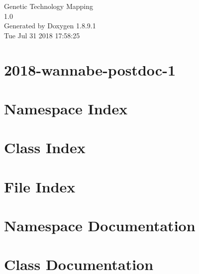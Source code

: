 \documentclass[twoside]{book}
\newcommand{\+}{\discretionary{\mbox{\scriptsize$\hookleftarrow$}}{}{}}
\newcommand{\clearemptydoublepage}{%
  \newpage{\pagestyle{empty}\cleardoublepage}%
}
\begin{document}
\hypersetup{pageanchor=false,
             bookmarks=true,
             bookmarksnumbered=true,
             pdfencoding=unicode
            }
\begin{titlepage}
\vspace*{7cm}
\begin{center}%
{\Large Genetic Technology Mapping \\[1ex]\large 1.\+0 }\\
\vspace*{1cm}
{\large Generated by Doxygen 1.8.9.1}\\
\vspace*{0.5cm}
{\small Tue Jul 31 2018 17:58:25}\\
\end{center}
\end{titlepage}
\clearemptydoublepage
\tableofcontents
\clearemptydoublepage
{}
\hypersetup{pageanchor=true}

\chapter{2018-\/wannabe-\/postdoc-\/1}
\label{md_README}
\hypertarget{md_README}{}

\chapter{Namespace Index}

\chapter{Class Index}

\chapter{File Index}

\chapter{Namespace Documentation}









\chapter{Class Documentation}






\end{document}

